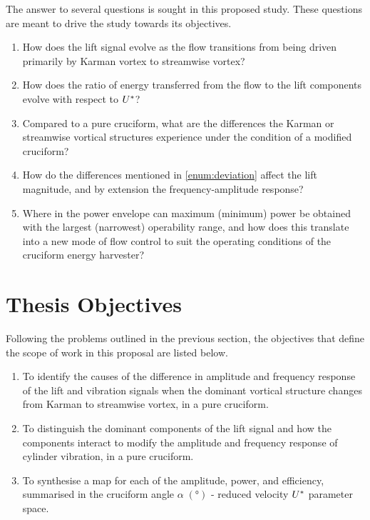 \documentclass[oneside]{utmthesis}
\begin{document}
The answer to several questions is sought in this proposed study. These questions are meant to drive the study towards its objectives.
\begin{enumerate}
  \item How does the lift signal evolve as the flow transitions from being driven primarily by Karman vortex to streamwise vortex?
  \item How does the ratio of energy transferred from the flow to the lift components evolve with respect to $U^{*}$?
  \item Compared to a pure cruciform, what are the differences the Karman or streamwise vortical structures experience under the condition of a modified cruciform? \label{enum:deviation}
  \item How do the differences mentioned in \ref{enum:deviation} affect the lift magnitude, and by extension the frequency-amplitude response?
  \item Where in the power envelope can maximum (minimum) power be obtained with the largest (narrowest) operability range, and how does this translate into a new mode of flow control to suit the operating conditions of the cruciform energy harvester?
\end{enumerate}

\section{Thesis Objectives} \label{sec:thesisObj}

\vspace{\baselineskip}

Following the problems outlined in the previous section, the objectives that define the scope of work in this proposal are listed below.

\begin{enumerate}
  \item To identify the causes of the difference in amplitude and frequency response of the lift and vibration signals when the dominant vortical structure changes from Karman to streamwise vortex, in a pure cruciform. \label{enum:whatHappens}

  \item To distinguish the dominant components of the lift signal and how the components interact to modify the amplitude and frequency response of cylinder vibration, in a pure cruciform. \label{enum:characteriseLift}

  \item To synthesise a map for each of the amplitude, power, and efficiency, summarised in the cruciform angle $\alpha \; (\si{\degree})$ - reduced velocity $U^{*}$ parameter space. \label{enum:passiveControl}
\end{enumerate}
\end{document}
